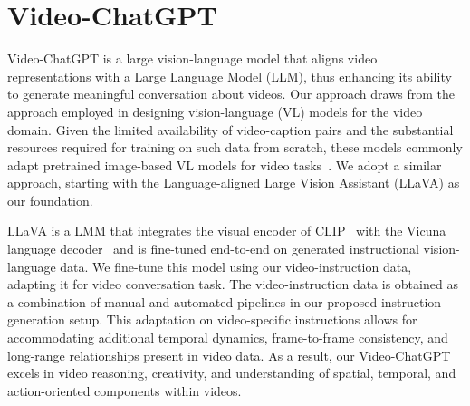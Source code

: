 \section{Video-ChatGPT}
Video-ChatGPT is a large vision-language model that aligns video representations with a Large Language Model (LLM), thus enhancing its ability to generate meaningful conversation about videos. Our approach draws from the approach employed in designing vision-language (VL) models for the video domain. Given the limited availability of video-caption pairs and the substantial resources required for training on such data from scratch, these models commonly adapt pretrained image-based VL models for video tasks~\cite{ni2022expanding, wang2021actionclip, hanoonavificlip}. We adopt a similar approach, starting with the Language-aligned Large Vision Assistant (LLaVA)\cite{liu2023llava} as our foundation.

LLaVA is a LMM that integrates the visual encoder of CLIP~\cite{radford2021learning} with the Vicuna language decoder~\cite{vicuna2023} and is fine-tuned end-to-end on generated instructional vision-language data. We fine-tune this model using our video-instruction data, adapting it for video conversation task. The video-instruction data is obtained as a combination of manual and automated pipelines in our proposed instruction generation setup. This adaptation on video-specific instructions allows for accommodating additional temporal dynamics, frame-to-frame consistency, and long-range relationships present in video data. As a result, our Video-ChatGPT excels in video reasoning, creativity, and understanding of spatial, temporal, and action-oriented components within videos.

